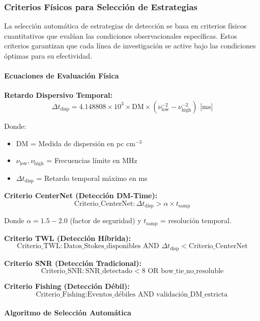 \subsubsection{Criterios Físicos para Selección de Estrategias}

La selección automática de estrategias de detección se basa en criterios físicos cuantitativos que evalúan las condiciones observacionales específicas. Estos criterios garantizan que cada línea de investigación se active bajo las condiciones óptimas para su efectividad.

\paragraph{Ecuaciones de Evaluación Física}

\textbf{Retardo Dispersivo Temporal:}
\[
\Delta t_{\text{disp}} = 4.148808 \times 10^3 \times \text{DM} \times (\nu_{\text{low}}^{-2} - \nu_{\text{high}}^{-2}) \text{ [ms]}
\]

Donde:
\begin{itemize}
\item $\text{DM}$ = Medida de dispersión en pc cm$^{-3}$
\item $\nu_{\text{low}}, \nu_{\text{high}}$ = Frecuencias límite en MHz
\item $\Delta t_{\text{disp}}$ = Retardo temporal máximo en ms
\end{itemize}

\textbf{Criterio CenterNet (Detección DM-Time):}
\[
\text{Criterio\_CenterNet}: \Delta t_{\text{disp}} > \alpha \times t_{\text{samp}}
\]

Donde $\alpha = 1.5-2.0$ (factor de seguridad) y $t_{\text{samp}}$ = resolución temporal.

\textbf{Criterio TWL (Detección Híbrida):}
\[
\text{Criterio\_TWL}: \text{Datos\_Stokes\_disponibles} \text{ AND } \Delta t_{\text{disp}} < \text{Criterio\_CenterNet}
\]

\textbf{Criterio SNR (Detección Tradicional):}
\[
\text{Criterio\_SNR}: \text{SNR\_detectado} < 8 \text{ OR } \text{bow\_tie\_no\_resoluble}
\]

\textbf{Criterio Fishing (Detección Débil):}
\[
\text{Criterio\_Fishing}: \text{Eventos\_débiles} \text{ AND } \text{validación\_DM\_estricta}
\]

\paragraph{Algoritmo de Selección Automática}

